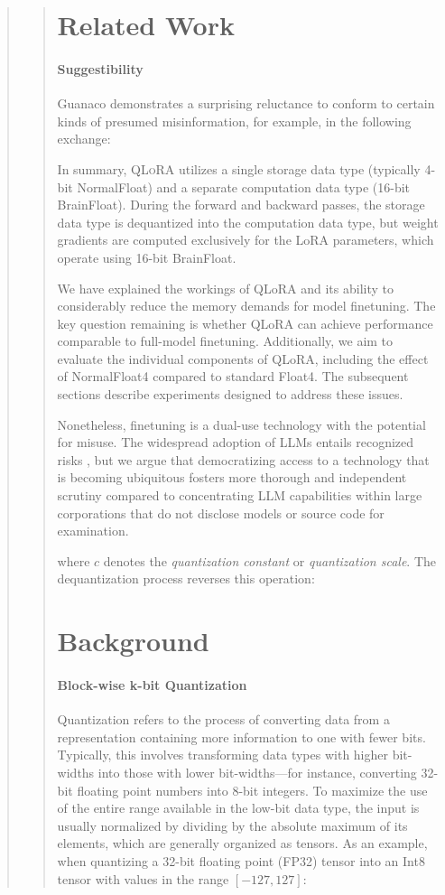 \begin{quote}
\begin{quote}
\section{Related Work}

\paragraph{Suggestibility} {Guanaco} demonstrates a surprising reluctance to conform to certain kinds of presumed misinformation, for example, in the following exchange:

In summary, \textsc{QLoRA} utilizes a single storage data type (typically 4-bit NormalFloat) and a separate computation data type (16-bit BrainFloat). During the forward and backward passes, the storage data type is dequantized into the computation data type, but weight gradients are computed exclusively for the LoRA parameters, which operate using 16-bit BrainFloat.

We have explained the workings of QLoRA and its ability to considerably reduce the memory demands for model finetuning. The key question remaining is whether QLoRA can achieve performance comparable to full-model finetuning. Additionally, we aim to evaluate the individual components of QLoRA, including the effect of NormalFloat4 compared to standard Float4. The subsequent sections describe experiments designed to address these issues.

Nonetheless, finetuning is a dual-use technology with the potential for misuse. The widespread adoption of LLMs entails recognized risks \citep{bommasani2021opportunities,bender2021dangers}, but we argue that democratizing access to a technology that is becoming ubiquitous fosters more thorough and independent scrutiny compared to concentrating LLM capabilities within large corporations that do not disclose models or source code for examination.

where $c$ denotes the {\em quantization constant} or {\em quantization scale}. The dequantization process reverses this operation:

\section{Background}
\paragraph{Block-wise k-bit Quantization} Quantization refers to the process of converting data from a representation containing more information to one with fewer bits. Typically, this involves transforming data types with higher bit-widths into those with lower bit-widths—for instance, converting 32-bit floating point numbers into 8-bit integers. To maximize the use of the entire range available in the low-bit data type, the input is usually normalized by dividing by the absolute maximum of its elements, which are generally organized as tensors. As an example, when quantizing a 32-bit floating point (FP32) tensor into an Int8 tensor with values in the range $[-127, 127]$:


\end{quote}
\end{quote}
